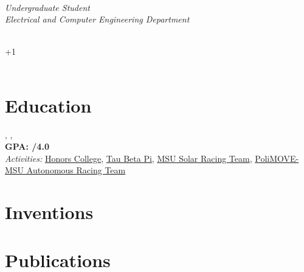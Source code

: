 \documentclass[11pt]{article}
\begin{document}
\begin{minipage}[t]{0.55\textwidth}
    {\Huge\textbf{\href{https://\myWebsite/}{\myName}}}\\[8pt]
    \textit{Undergraduate Student}\\
    \textit{Electrical and Computer Engineering Department}\\
    \textit{\eduSchool}
\end{minipage}%
\begin{minipage}[t]{0.45\textwidth}
    \raggedleft
    \myLocation\\
     +1~\myPhone\\
     \href{mailto:\myEmail}{\myEmail}\\
     \href{https://\myWebsite/}{\myWebsite}
\end{minipage}

\vspace{20pt}

\section{Education}

\textbf{\eduDegreeShort}, \eduSchool, \myCity \hfill \textbf{\eduDatesShort}\\
\null \hfill \textbf{GPA: \eduGpa/4.0} \\
\textit{Activities:} \href{https://honorscollege.msu.edu/}{Honors College}, \href{https://www.tbp.org}{Tau Beta Pi}, \href{https://msusolar.com/}{MSU Solar Racing Team}, \href{https://www.indyautonomouschallenge.com/politecnico-di-milano}{PoliMOVE-MSU Autonomous Racing Team}



\section{Inventions}
\begin{refsection}
\nocite{*}
\printbibliography[heading=none,keyword=invention]
\end{refsection}

\section{Publications}
\begin{refsection}
\nocite{*}
\printbibliography[heading=none,notkeyword=invention]
\end{refsection}




\end{document}
